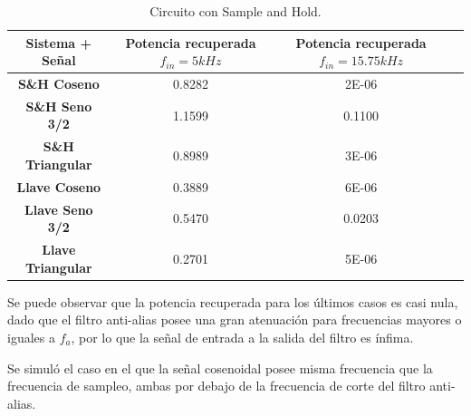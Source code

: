 \begin{table}[H]
\centering
\begin{tabular}{cccc}
\hline
\textbf{Sistema + Señal}  & \textbf{Potencia recuperada $f_{in}=5kHz$} & \textbf{Potencia recuperada $f_{in}=15.75kHz$} \\ \hline
\textbf{S\&H Coseno}     & 0.8282   & 2E-06\\
\textbf{S\&H Seno 3/2}   & 1.1599  & 0.1100\\
\textbf{S\&H Triangular} & 0.8989  & 3E-06\\
\textbf{Llave Coseno}     & 0.3889 & 6E-06 \\
\textbf{Llave Seno 3/2}   & 0.5470  & 0.0203\\
\textbf{Llave Triangular} & 0.2701	& 5E-06\\ \hline
\end{tabular}
\caption{Circuito con Sample and Hold.}
\label{tab:res3}
\end{table}

Se puede observar que la potencia recuperada para los últimos casos es casi nula, dado que el filtro anti-alias posee una gran atenuación para frecuencias mayores o iguales a $f_a$, por lo que la señal de entrada a la salida del filtro es ínfima.

Se simuló el caso en el que la señal cosenoidal posee misma frecuencia que la frecuencia de sampleo, ambas por debajo de la frecuencia de corte del filtro anti-alias.


